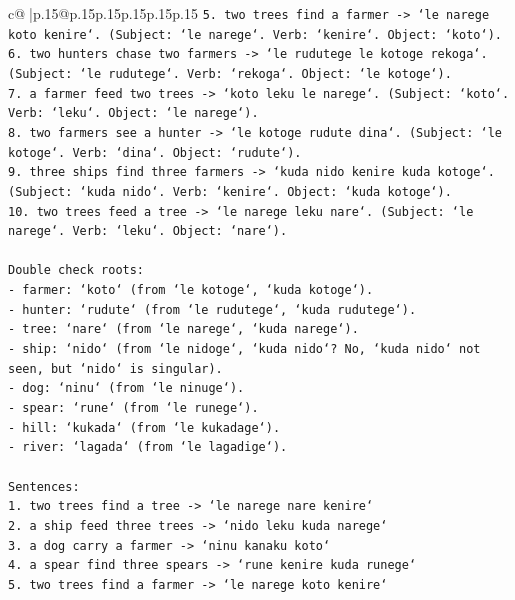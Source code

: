 \documentclass{article}
\begin{document}
{\begin{supertabular}{c@{$\;$}|p{.15\linewidth}@{}p{.15\linewidth}p{.15\linewidth}p{.15\linewidth}p{.15\linewidth}p{.15\linewidth}}
{{{\texttt{5. two trees find a farmer {-}> `le narege koto kenire`. (Subject: `le narege`. Verb: `kenire`. Object: `koto`).} \\
\texttt{6. two hunters chase two farmers {-}> `le rudutege le kotoge rekoga`. (Subject: `le rudutege`. Verb: `rekoga`. Object: `le kotoge`).} \\
\texttt{7. a farmer feed two trees {-}> `koto leku le narege`. (Subject: `koto`. Verb: `leku`. Object: `le narege`).} \\
\texttt{8. two farmers see a hunter {-}> `le kotoge rudute dina`. (Subject: `le kotoge`. Verb: `dina`. Object: `rudute`).} \\
\texttt{9. three ships find three farmers {-}> `kuda nido kenire kuda kotoge`. (Subject: `kuda nido`. Verb: `kenire`. Object: `kuda kotoge`).} \\
\texttt{10. two trees feed a tree {-}> `le narege leku nare`. (Subject: `le narege`. Verb: `leku`. Object: `nare`).} \\
\\ 
\texttt{Double check roots:} \\
\texttt{{-} farmer: `koto` (from `le kotoge`, `kuda kotoge`).} \\
\texttt{{-} hunter: `rudute` (from `le rudutege`, `kuda rudutege`).} \\
\texttt{{-} tree: `nare` (from `le narege`, `kuda narege`).} \\
\texttt{{-} ship: `nido` (from `le nidoge`, `kuda nido`? No, `kuda nido` not seen, but `nido` is singular).} \\
\texttt{{-} dog: `ninu` (from `le ninuge`).} \\
\texttt{{-} spear: `rune` (from `le runege`).} \\
\texttt{{-} hill: `kukada` (from `le kukadage`).} \\
\texttt{{-} river: `lagada` (from `le lagadige`).} \\
\\ 
\texttt{Sentences:} \\
\texttt{1. two trees find a tree {-}> `le narege nare kenire`} \\
\texttt{2. a ship feed three trees {-}> `nido leku kuda narege`} \\
\texttt{3. a dog carry a farmer {-}> `ninu kanaku koto`} \\
\texttt{4. a spear find three spears {-}> `rune kenire kuda runege`} \\
\texttt{5. two trees find a farmer {-}> `le narege koto kenire`} \\
}}}
\end{supertabular}}
\end{document}
